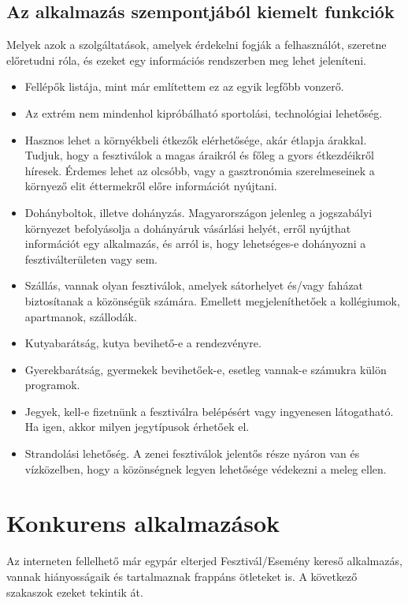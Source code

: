 \subsection{Az alkalmazás szempontjából kiemelt funkciók}

Melyek azok a szolgáltatások, amelyek érdekelni fogják a felhasználót, szeretne előretudni róla, és ezeket egy információs rendszerben meg lehet jeleníteni.
\begin{itemize}
\item Fellépők listája, mint már említettem ez az egyik legfőbb vonzerő.
\item Az extrém nem mindenhol kipróbálható sportolási, technológiai lehetőség.
\item Hasznos lehet a környékbeli étkezők elérhetősége, akár étlapja árakkal. Tudjuk, hogy a fesztiválok a magas áraikról és főleg a gyors étkezdéikről híresek. Érdemes lehet az olcsóbb, vagy a gasztronómia szerelmeseinek a környező elit éttermekről előre információt nyújtani.
\item Dohányboltok, illetve dohányzás. Magyarországon jelenleg a jogszabályi környezet befolyásolja a dohányáruk vásárlási helyét, erről nyújthat információt egy alkalmazás, és arról is, hogy lehetséges-e dohányozni a fesztiválterületen vagy sem.
\item Szállás, vannak olyan fesztiválok, amelyek sátorhelyet és/vagy faházat biztosítanak a közönségük számára. Emellett megjeleníthetőek a kollégiumok, apartmanok, szállodák.
\item Kutyabarátság, kutya bevihető-e a rendezvényre.
\item Gyerekbarátság, gyermekek bevihetőek-e, esetleg vannak-e számukra külön programok.
\item Jegyek, kell-e fizetnünk a fesztiválra belépésért vagy ingyenesen látogatható. Ha igen, akkor milyen jegytípusok érhetőek el.
\item Strandolási lehetőség. A zenei fesztiválok jelentős része nyáron van és vízközelben, hogy a közönségnek legyen lehetősége védekezni a meleg ellen.
\end{itemize}

\section{Konkurens alkalmazások}

Az interneten fellelhető már egypár elterjed Fesztivál/Esemény kereső alkalmazás, vannak hiányosságaik és tartalmaznak frappáns ötleteket is. A következő szakaszok ezeket tekintik át.

